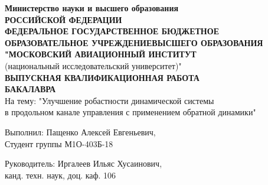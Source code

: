 \begin{frame}
    \begin{center}
        \textbf{Министерство науки и высшего образования \\ РОССИЙСКОЙ ФЕДЕРАЦИИ \\
        ФЕДЕРАЛЬНОЕ ГОСУДАРСТВЕННОЕ БЮДЖЕТНОЕ ОБРАЗОВАТЕЛЬНОЕ УЧРЕЖДЕНИЕВЫСШЕГО ОБРАЗОВАНИЯ \\
        "МОСКОВСКИЙ АВИАЦИОННЫЙ ИНСТИТУТ } \\ (национальный исследовательский университет)" \\ 
        \textbf{ВЫПУСКНАЯ КВАЛИФИКАЦИОННАЯ РАБОТА \\ БАКАЛАВРА} \\ 
        На тему: "Улучшение робастности динамической системы \\ в продольном канале управления с применением обратной динамики"
    \end{center}
    \hfill \break
    Выполнил: Пащенко Алексей Евгеньевич, \\
    Студент группы М1О-403Б-18 \hfill \break

    Руководитель: Иргалеев Ильяс Хусаинович, \\ 
    канд. техн. наук, доц. каф. 106
\end{frame}